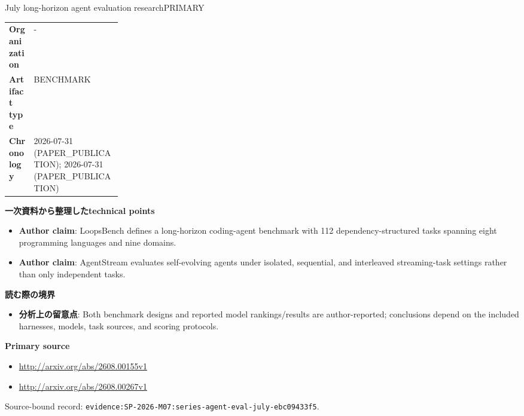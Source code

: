 \begin{technicalnote}{July long-horizon agent evaluation research}{PRIMARY}
\begin{tabularx}{\linewidth}{@{}>{\bfseries}p{0.22\linewidth}X@{}}
Organization & - \\
Artifact type & BENCHMARK \\
Chronology & 2026-07-31 (PAPER\_PUBLICATION); 2026-07-31 (PAPER\_PUBLICATION) \\
\end{tabularx}
\smallskip
{\bfseries 一次資料から整理したtechnical points}
\begin{itemize}[leftmargin=1.5em,itemsep=0.35em]
\item \textbf{Author claim}: LoopsBench defines a long-horizon coding-agent benchmark with 112 dependency-structured tasks spanning eight programming languages and nine domains.
\item \textbf{Author claim}: AgentStream evaluates self-evolving agents under isolated, sequential, and interleaved streaming-task settings rather than only independent tasks.
\end{itemize}
{\bfseries 読む際の境界}
\begin{itemize}[leftmargin=1.5em,itemsep=0.35em]
\item \textbf{分析上の留意点}: Both benchmark designs and reported model rankings/results are author-reported; conclusions depend on the included harnesses, models, task sources, and scoring protocols.
\end{itemize}
{\bfseries Primary source}
\begin{itemize}[leftmargin=1.5em,itemsep=0.25em]
\item \url{http://arxiv.org/abs/2608.00155v1}
\item \url{http://arxiv.org/abs/2608.00267v1}
\end{itemize}
{\scriptsize\color{SurveyMuted}Source-bound record: \texttt{evidence:SP-2026-M07:series-agent-eval-july-ebc09433f5}.}
\end{technicalnote}
\medskip

